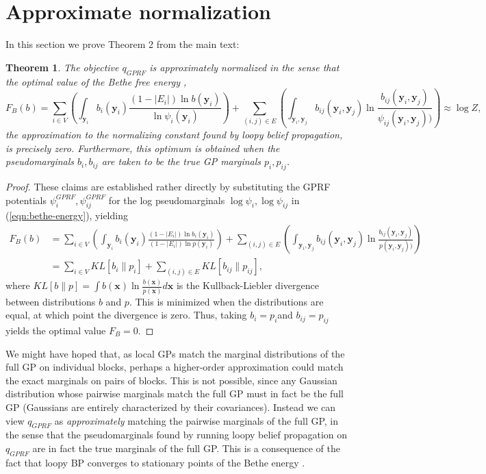 \documentclass{article}
\newtheorem{theorem}{Theorem}
\renewcommand{\v}[1]{\mathbf{#1}}
\begin{document}
\section{Approximate normalization}
\label{sec:approx-norm}

In this section we prove Theorem 2 from the main text:

\setcounter{theorem}{1}
\begin{theorem}
The objective $q_{GPRF}$ is approximately normalized in the sense that
the optimal value of the {\em Bethe free energy} \cite{yedidia2001bethe}, 
\begin{equation}
F_B(b) = \sum_{i\in V} \left(\int_{\v{y}_i} b_i(\v{y}_i) \frac{(1-|E_i|)\ln
    b(\v{y}_i)}{\ln \psi_i(\v{y}_i)}\right)  + \sum_{(i,j)\in E} \left(\int_{\v{y}_i, \v{y}_j} b_{ij}(\v{y}_i,
  \v{y}_j) \ln \frac{b_{ij}(\v{y}_i,
  \v{y}_j)}{\psi_{ij}(\v{y}_i, \v{y}_j))}\right)
\label{eqn:bethe-energy} \approx \log Z,
\end{equation}
the approximation to the normalizing constant found by loopy belief
propagation, is precisely zero. Furthermore, this
optimum is obtained when the pseudomarginals $b_i, b_{ij}$ are
taken to be the true GP marginals $p_i, p_{ij}$. 
\end{theorem}
\begin{proof}
These claims are established rather directly by substituting the GPRF potentials $\psi_i^{GPRF}, \psi_{ij}^{GPRF}$ for the log pseudomarginals $\log \psi_{i}, \log \psi_{ij}$ in (\ref{eqn:bethe-energy}), yielding
\begin{align}
 F_B(b)&= \sum_{i\in V} \left(\int_{\v{y}_i} b_i(\v{y}_i) \frac{(1-|E_i|)\ln
    b_i(\v{y}_i)}{(1-|E_i|) \ln p(\v{y}_i) }\right)  + \sum_{(i,j)\in E} \left(\int_{\v{y}_i, \v{y}_j} b_{ij}(\v{y}_i,
  \v{y}_j) \ln \frac{b_{ij}(\v{y}_i,
  \v{y}_j)}{p(\v{y}_i, \v{y}_j))}\right) \nonumber\\
&= \sum_{i\in V} KL[b_i \| p_i] + \sum_{(i,j)\in E} KL[b_{ij}\| p_{ij}],
\end{align}
where $KL[b\|p] = \int b(\v{x}) \ln \frac{b(\v{x})}{p(\v{x})}d\v{x}$
is the Kullback-Liebler divergence between distributions $b$ and
$p$.  This is minimized when the distributions are equal, at which
point the divergence is zero. Thus, taking $b_i=p_i$and
$b_{ij}=p_{ij}$ yields the optimal value $F_B=0$. 
\end{proof}

We might have hoped that, as local GPs match the marginal
distributions of the full GP on individual blocks, perhaps a
higher-order approximation could match the exact marginals on pairs of
blocks. This is not possible, since any Gaussian distribution whose
pairwise marginals match the full GP must in fact be the full GP
(Gaussians are entirely characterized by their covariances). Instead we
can view $q_{GPRF}$ as {\em approximately} matching the pairwise
marginals of the full GP, in the sense that the pseudomarginals found
by running loopy belief propagation on $q_{GPRF}$ are in fact the true
marginals of the full GP. This is a consequence of the fact that loopy
BP converges to stationary points of the Bethe energy
\cite{yedidia2001bethe}.
 


\end{document}
